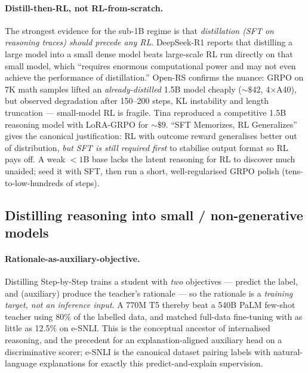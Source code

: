 \paragraph{Distill-then-RL, not RL-from-scratch.} The strongest evidence for the
sub-1B regime is that \emph{distillation (SFT on reasoning traces) should precede
any RL}. DeepSeek-R1 \citep{rl:deepseekr1} reports that distilling a large model
into a small dense model beats large-scale RL run directly on that small model,
which ``requires enormous computational power and may not even achieve the
performance of distillation.'' Open-RS \citep{rl:dang2025openrs} confirms the
nuance: GRPO on 7K math samples lifted an \emph{already-distilled} 1.5B model
cheaply (${\sim}\$42$, 4$\times$A40), but observed degradation after 150--200
steps, KL instability and length truncation --- small-model RL is fragile. Tina
\citep{rl:wang2025tina} reproduced a competitive 1.5B reasoning model with
LoRA-GRPO for ${\sim}\$9$. ``SFT Memorizes, RL Generalizes''
\citep{rl:chu2025sftrl} gives the canonical justification: RL with outcome reward
generalises better out of distribution, \emph{but SFT is still required first} to
stabilise output format so RL pays off. A weak $<\!1$B base lacks the latent
reasoning for RL to discover much unaided; seed it with SFT, then run a short,
well-regularised GRPO polish (tens-to-low-hundreds of steps).

\subsection{Distilling reasoning into small / non-generative models}
\label{sec:distillation}
\paragraph{Rationale-as-auxiliary-objective.} Distilling Step-by-Step
\citep{rl:hsieh2023distillstep} trains a student with \emph{two} objectives ---
predict the label, and (auxiliary) produce the teacher's rationale --- so the
rationale is a \emph{training target, not an inference input}. A 770M T5 thereby
beat a 540B PaLM few-shot teacher using 80\% of the labelled data, and matched
full-data fine-tuning with as little as 12.5\% on e-SNLI. This is the conceptual
ancestor of internalised reasoning, and the precedent for an explanation-aligned
auxiliary head on a discriminative scorer; e-SNLI \citep{rl:camburu2018esnli} is
the canonical dataset pairing labels with natural-language explanations for
exactly this predict-and-explain supervision.

